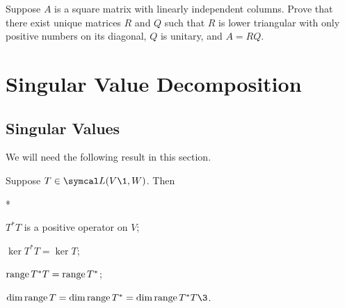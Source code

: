 \begin{exercises}
\exercise
Suppose $A$ is a square matrix with linearly independent columns. Prove that there exist unique matrices $R$ and $Q$ such that $R$ is lower triangular with only positive numbers on its diagonal, $Q$ is unitary, and $A = RQ$.\label{7Cholt}

\end{exercises}

\section{Singular Value Decomposition} \label{2SVD}

\subsection{Singular Values}

We will need the following result in this section.

{Suppose $T \in \L(V\1, W)$. Then
\begin{subtheorem}*
\item
$T^* T$ is a positive operator on $V$;
\item
$\ker T^*T = \ker T$;
\item
$\operatorname{range} T^*T = \operatorname{range} T^*$;
\item
$\dim \ran T = \dim \ran T^* = \dim \ran T^* T\3$.
\end{subtheorem}}

